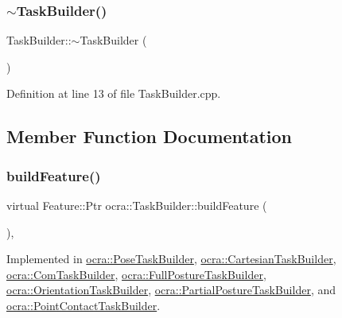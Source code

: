 \subsubsection{\texorpdfstring{$\sim$\+Task\+Builder()}{~TaskBuilder()}}
{\footnotesize\ttfamily Task\+Builder\+::$\sim$\+Task\+Builder (\begin{DoxyParamCaption}{ }\end{DoxyParamCaption})\hspace{0.3cm}{\ttfamily [virtual]}}



Definition at line 13 of file Task\+Builder.\+cpp.



\subsection{Member Function Documentation}
\hypertarget{classocra_1_1TaskBuilder_a58c0dc416a9607a344a080248ee26ac2}{}\label{classocra_1_1TaskBuilder_a58c0dc416a9607a344a080248ee26ac2} 
\subsubsection{\texorpdfstring{build\+Feature()}{buildFeature()}}
{\footnotesize\ttfamily virtual Feature\+::\+Ptr ocra\+::\+Task\+Builder\+::build\+Feature (\begin{DoxyParamCaption}{ }\end{DoxyParamCaption})\hspace{0.3cm}{\ttfamily [protected]}, {}}



Implemented in \hyperlink{classocra_1_1PoseTaskBuilder_a9a5cd51010fb610f00eea794e1f8f701}{ocra\+::\+Pose\+Task\+Builder}, \hyperlink{classocra_1_1CartesianTaskBuilder_a58c8e4a299db03180c058eefcd711052}{ocra\+::\+Cartesian\+Task\+Builder}, \hyperlink{classocra_1_1ComTaskBuilder_aa4e0d21159da91788a1d2806ddca84da}{ocra\+::\+Com\+Task\+Builder}, \hyperlink{classocra_1_1FullPostureTaskBuilder_a7651ca4fd2ef7c8096a399b128981122}{ocra\+::\+Full\+Posture\+Task\+Builder}, \hyperlink{classocra_1_1OrientationTaskBuilder_a38d5badfcdbcdbc745f305e38af8b737}{ocra\+::\+Orientation\+Task\+Builder}, \hyperlink{classocra_1_1PartialPostureTaskBuilder_ab4a80855ccc820bbeabf4eed87487784}{ocra\+::\+Partial\+Posture\+Task\+Builder}, and \hyperlink{classocra_1_1PointContactTaskBuilder_a220c35d105a88cd0e2407779ab1556f2}{ocra\+::\+Point\+Contact\+Task\+Builder}.

